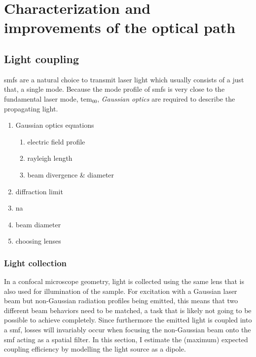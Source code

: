 \chapter{Characterization and improvements of the optical path}\label{ch:setup:optics}

\section{Light coupling}\label{sec:setup:optics:coupling}
\Glspl{smf} are a natural choice to transmit laser light which usually consists of a just that, a single mode.
Because the mode profile of \glspl{smf} is very close to the fundamental laser mode, \acrshort{tem}$_{00}$, \emph{Gaussian optics} are required to describe the propagating light.

\begin{enumerate}
    \item Gaussian optics equations \begin{enumerate}
        \item electric field profile
        \item rayleigh length
        \item beam divergence \& diameter
    \end{enumerate}
    \item diffraction limit
    \item \gls{na}
    \item beam diameter
    \item choosing lenses
\end{enumerate}

\subsection{Light collection}\label{sec:setup:optics:coupling:detection}
In a confocal microscope geometry, light is collected using the same lens that is also used for illumination of the sample.
For excitation with a Gaussian laser beam but non-Gaussian radiation profiles being emitted, this means that two different beam behaviors need to be matched, a task that is likely not going to be possible to achieve completely.
Since furthermore the emitted light is coupled into a \gls{smf}, losses will invariably occur when focusing the non-Gaussian beam onto the \gls{smf} acting as a spatial filter.
In this section, I estimate the (maximum) expected coupling efficiency by modelling the light source as a dipole.

